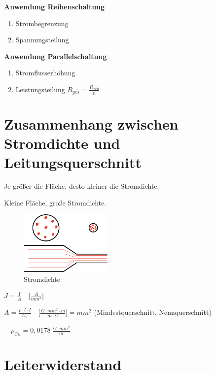 \textbf{Anwendung Reihenschaltung}

\begin{enumerate}
\def\labelenumi{(\arabic{enumi})}
\item
  Strombegrenzung
\item
  Spannungsteilung
\end{enumerate}

\textbf{Anwendung Parallelschaltung}

\begin{enumerate}
\def\labelenumi{(\arabic{enumi})}
\item
  Stromflusserhöhung
\item
  Leistungsteilung $\boxed{R_{ges} = \frac{R_{Teil}}{n}}$
\end{enumerate}

\section{Zusammenhang zwischen Stromdichte und
Leitungsquerschnitt}\label{zusammenhang-zwischen-stromdichte-und-leitungsquerschnitt}

Je größer die Fläche, desto kleiner die Stromdichte.

Kleine Fläche, große Stromdichte.

\begin{figure}[!ht]%
\centering
\includegraphics[width=0.4\textwidth]{images/Skizze/04_Stromdichte_Skizze.pdf}
\caption{Stromdichte}
\end{figure}

$\boxed{J = \frac{I}{A}} \quad \bigl[\frac{A}{mm^2}\bigl]$

$\boxed{A = \frac{\rho \cdot l \cdot I}{U_v}} \quad \bigl[\frac{\Omega \cdot mm^2 \cdot m}{m \cdot \Omega}\bigl] = mm^2$
(Mindestquerschnitt, Nennquerschnitt)

$\quad \rho_{Cu} = 0,0178~\frac{\Omega \cdot mm^2}{m}$

\section{Leiterwiderstand}\label{leiterwiderstand}

